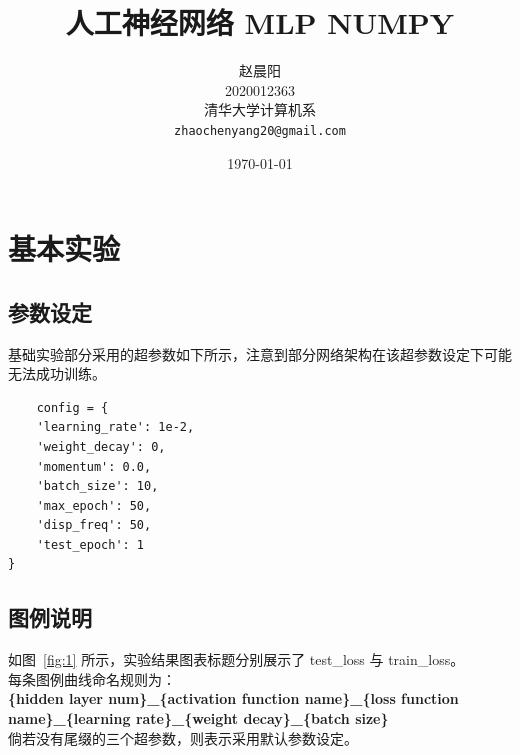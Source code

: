 \documentclass{article}
\title{人工神经网络 MLP NUMPY}
\date{\today}
\author{
	赵晨阳\\
	2020012363\\
	清华大学计算机系\\
	\texttt{zhaochenyang20@gmail.com}
}
\begin{document}
\maketitle

\section{基本实验}
\subsection{参数设定}
基础实验部分采用的超参数如下所示，注意到部分网络架构在该超参数设定下可能无法成功训练。
\begin{verbatim}
	config = {
    'learning_rate': 1e-2,
    'weight_decay': 0,
    'momentum': 0.0,
    'batch_size': 10,
    'max_epoch': 50,
    'disp_freq': 50,
    'test_epoch': 1
}
\end{verbatim}

\subsection{图例说明}

如图~\ref{fig:1} 所示，实验结果图表标题分别展示了 test\_loss 与 train\_loss。\\
每条图例曲线命名规则为：\\
\textbf{\{hidden layer num\}\_\{activation function name\}\_\{loss function name\}\_\{learning rate\}\_\{weight decay\}\_\{batch size\}}\\
倘若没有尾缀的三个超参数，则表示采用默认参数设定。
\end{document}
